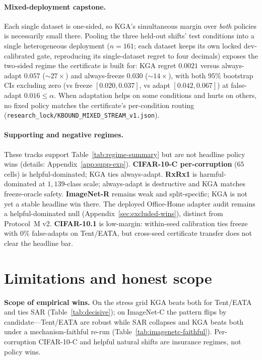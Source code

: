\documentclass[11pt]{article}
\theoremstyle{plain}
\theoremstyle{definition}
\theoremstyle{remark}
\begin{document}
\paragraph{Mixed-deployment capstone.}
Each single dataset is one-sided, so \textsc{KGA}'s simultaneous margin over \emph{both}
policies is necessarily small there. Pooling the three held-out shifts' test conditions into a
single heterogeneous deployment ($n{=}161$; each dataset keeps its own locked dev-calibrated
gate, reproducing its single-dataset regret to four decimals) exposes the two-sided regime the
certificate is built for: \textsc{KGA} regret $0.0021$ versus always-adapt $0.057$
($\sim\!27\times$) and always-freeze $0.030$ ($\sim\!14\times$), with both $95\%$ bootstrap CIs
excluding zero (vs freeze $[0.020,0.037]$, vs adapt $[0.042,0.067]$) at false-adapt
$0.016\le\alpha$. When adaptation helps on some conditions and hurts on others, no fixed policy
matches the certificate's per-condition routing
(\texttt{research\_lock/KBOUND\_MIXED\_STREAM\_v1.json}).

\paragraph{Supporting and negative regimes.}
These tracks support Table~\ref{tab:regime-summary} but are not headline policy wins
(details: Appendix~\ref{app:supp-exp}).
\textbf{CIFAR-10-C per-corruption} ($65$ cells) is helpful-dominated; \textsc{KGA} ties
always-adapt.
\textbf{RxRx1} is harmful-dominated at $1{,}139$-class scale; always-adapt is destructive
and \textsc{KGA} matches freeze-oracle safety.
\textbf{ImageNet-R} remains weak and split-specific; \textsc{KGA} is not yet a stable
headline win there. The deployed Office-Home adapter audit remains a helpful-dominated
null (Appendix~\ref{sec:excluded-wins}), distinct from Protocol~M v2.
\textbf{CIFAR-10.1} is low-margin: within-seed calibration ties freeze with $0\%$
false-adapts on Tent/EATA, but cross-seed certificate transfer does not clear the
headline bar.

\section{Limitations and honest scope}\label{sec:limits}

\medskip
\textbf{Scope of empirical wins.} On the stress grid \textsc{KGA} beats both for Tent/EATA
and ties SAR (Table~\ref{tab:decisive}); on ImageNet-C the pattern flips by candidate---Tent/EATA
are robust while SAR collapses and \textsc{KGA} beats both under a mechanism-faithful re-run
(Table~\ref{tab:imagenetc-faithful}). Per-corruption CIFAR-10-C and helpful natural shifts are
insurance regimes, not policy wins.
\end{document}
